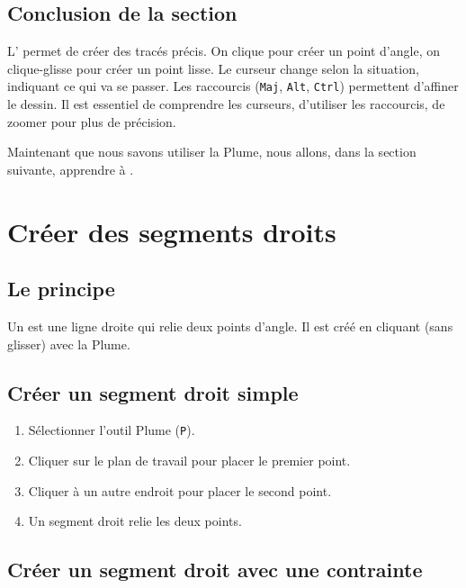 \subsection*{Conclusion de la section}

L' permet de créer des tracés précis. On clique pour créer un point d'angle, on clique-glisse pour créer un point lisse. Le curseur change selon la situation, indiquant ce qui va se passer. Les raccourcis (\texttt{Maj}, \texttt{Alt}, \texttt{Ctrl}) permettent d'affiner le dessin. Il est essentiel de comprendre les curseurs, d'utiliser les raccourcis, de zoomer pour plus de précision.

Maintenant que nous savons utiliser la Plume, nous allons, dans la section suivante, apprendre à .

\section{Créer des segments droits}

\subsection{Le principe}

Un  est une ligne droite qui relie deux points d'angle. Il est créé en cliquant (sans glisser) avec la Plume.

\subsection{Créer un segment droit simple}

\begin{enumerate}
    \item Sélectionner l'outil Plume (\texttt{P}).
    \item Cliquer sur le plan de travail pour placer le premier point.
    \item Cliquer à un autre endroit pour placer le second point.
    \item Un segment droit relie les deux points.
\end{enumerate}

\subsection{Créer un segment droit avec une contrainte}

